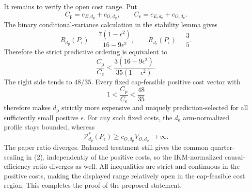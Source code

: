 It remains to verify the open cost range. Put
\[
 C_{\mathrm p}=c_{E,d_{\mathrm p}}+c_{O,d_{\mathrm p}},
 \qquad
 C_{\mathrm e}=c_{E,d_{\mathrm e}}+c_{O,d_{\mathrm e}}.
\]
The binary conditional-variance calculation in the stability lemma gives
\[
 R_{d_{\mathrm p}}(P_\epsilon)
 =\frac{7(1-\epsilon^2)}{16-9\epsilon^2},
 \qquad
 R_{d_{\mathrm e}}(P_\epsilon)=\frac35.
\]
Therefore the strict predictive ordering is equivalent to
\[
 \frac{C_{\mathrm p}}{C_{\mathrm e}}
 <\frac{3(16-9\epsilon^2)}{35(1-\epsilon^2)}. \tag{5}
\]
The right side tends to \(48/35\). Every fixed cap-feasible positive cost vector with
\[
 1<\frac{C_{\mathrm p}}{C_{\mathrm e}}<\frac{48}{35}
\]
therefore makes \(d_{\mathrm p}\) strictly more expensive and uniquely prediction-selected for all sufficiently small positive \(\epsilon\). For any such fixed costs, the \(d_{\mathrm e}\) arm-normalized profile stays bounded, whereas
\[
 \mathcal V_{d_{\mathrm p}}^*(P_\epsilon)
 \ge c_{O,d_{\mathrm p}}V_{O,d_{\mathrm p}}\longrightarrow\infty.
\]
The paper ratio diverges. Balanced treatment still gives the common quarter-scaling in (2), independently of the positive costs, so the IKM-normalized causal-efficiency ratio diverges as well. All inequalities are strict and continuous in the positive costs, making the displayed range relatively open in the cap-feasible cost region. This completes the proof of the proposed statement.